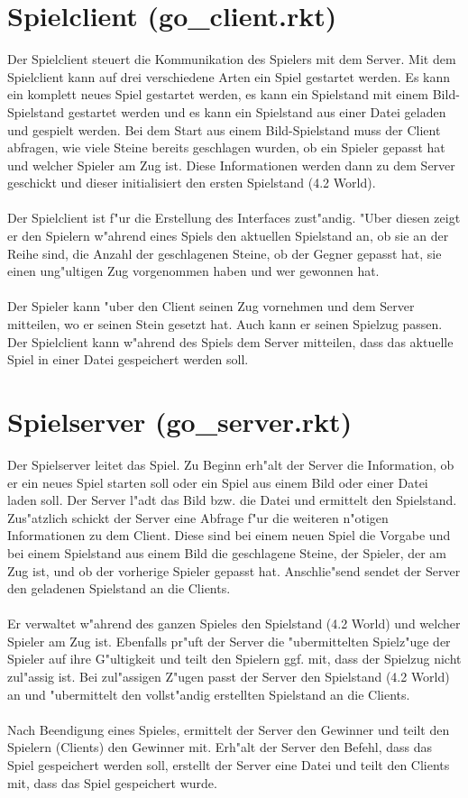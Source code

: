\documentclass[a4paper]{scrreprt}
\begin{document}
\section{Spielclient (go\_client.rkt)}
Der Spielclient steuert die Kommunikation des Spielers mit dem Server. Mit dem Spielclient kann  auf drei verschiedene Arten ein Spiel gestartet werden. Es kann ein komplett neues Spiel gestartet werden, es kann ein Spielstand mit einem Bild-Spielstand gestartet werden und es kann ein Spielstand aus einer Datei geladen und gespielt werden. Bei dem Start aus einem Bild-Spielstand muss der Client abfragen, wie viele Steine bereits geschlagen wurden, ob ein Spieler gepasst hat und welcher Spieler am Zug ist. Diese Informationen werden dann zu dem Server geschickt und dieser initialisiert den ersten Spielstand (4.2 World). \\\\
Der Spielclient ist f"ur die Erstellung des Interfaces zust"andig. "Uber diesen zeigt er den Spielern w"ahrend eines Spiels den aktuellen Spielstand an, ob sie an der Reihe sind, die Anzahl der geschlagenen Steine, ob der Gegner gepasst hat, sie einen ung"ultigen Zug vorgenommen haben und wer gewonnen hat.\\\\ 
Der Spieler kann "uber den Client seinen Zug vornehmen und dem Server mitteilen, wo er seinen Stein gesetzt hat. Auch kann er seinen Spielzug passen. Der Spielclient kann w"ahrend des Spiels dem Server mitteilen, dass das aktuelle Spiel in einer Datei gespeichert werden soll.

\section{Spielserver (go\_server.rkt)}
Der Spielserver leitet das Spiel. Zu Beginn erh"alt der Server die Information, ob er ein neues Spiel starten soll oder ein Spiel aus einem Bild oder einer Datei laden soll. Der Server l"adt das Bild bzw. die Datei und ermittelt den Spielstand. Zus"atzlich schickt der Server eine Abfrage f"ur die weiteren n"otigen Informationen zu dem Client. Diese sind bei einem neuen Spiel die Vorgabe und bei einem Spielstand aus einem Bild die geschlagene Steine, der Spieler, der am Zug ist, und ob der vorherige Spieler gepasst hat. Anschlie"send sendet der Server den geladenen Spielstand an die Clients.\\\\
Er verwaltet w"ahrend des ganzen Spieles den Spielstand (4.2 World) und welcher Spieler am Zug ist. Ebenfalls pr"uft der Server die "ubermittelten Spielz"uge der Spieler auf ihre G"ultigkeit und teilt den Spielern ggf. mit, dass der Spielzug nicht zul"assig ist. Bei zul"assigen Z"ugen passt der Server den Spielstand (4.2 World) an und "ubermittelt den vollst"andig erstellten Spielstand an die Clients.\\\\ 
Nach Beendigung eines Spieles, ermittelt der Server den Gewinner und teilt den Spielern (Clients) den Gewinner mit. Erh"alt der Server den Befehl, dass das Spiel gespeichert werden soll, erstellt der Server eine Datei und teilt den Clients mit, dass das Spiel gespeichert wurde.
\end{document}
